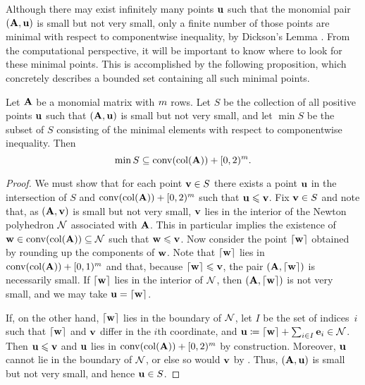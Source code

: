 \documentclass{amsart}
\begin{document}
Although there may exist infinitely many points $\mathbf{u}$ such that the monomial pair $(\mathbf{A},\mathbf{u})$ is small but not very small, only a finite number of those points are minimal with respect to componentwise inequality, by Dickson's Lemma \cite[Lemma~A]{dickson}.
From the computational perspective, it will be important to know where to look for these minimal points.
This is accomplished by the following proposition, which concretely describes a bounded set containing all such minimal points.

\begin{proposition}
   \label{prop: where to find minimal smal but not very small points}
   Let $\mathbf{A}$ be a monomial matrix with $m$ rows.
   Let $S$ be the collection of all positive points $\mathbf{u}$ such that $(\mathbf{A},\mathbf{u})$ is small but not very small, and let $\min S$ be the subset of $S$ consisting of the minimal elements with respect to componentwise inequality.
   Then
   \[\min S \subseteq \operatorname{conv}(\operatorname{col}(\mathbf{A})) + [0,2)^m.\]
\end{proposition}

\begin{proof}
   We must show that for each point $\mathbf{v} \in S$ there exists a point $\mathbf{u}$ in the intersection of $S$ and $\operatorname{conv}(\operatorname{col}(\mathbf{A})) + [0,2)^m$ such that $\mathbf{u}\leqslant \mathbf{v}$.
   Fix $\mathbf{v} \in S$ and note that, as $(\mathbf{A},\mathbf{v})$ is small but not very small, $\mathbf{v}$ lies in the interior of the Newton polyhedron $\mathcal{N}$ associated with $\mathbf{A}$.
   This in particular implies the existence of $\mathbf{w} \in \operatorname{conv}(\operatorname{col}(\mathbf{A})) \subseteq \mathcal{N}$ such that $\mathbf{w} \leqslant \mathbf{v}$.
   Now consider the point $\left\lceil \mathbf{w} \right\rceil$ obtained by rounding up the components of $\mathbf{w}$.
   Note that $\left\lceil \mathbf{w} \right\rceil$ lies in $\operatorname{conv}(\operatorname{col}(\mathbf{A})) + [0,1)^m$ and that, because $\left\lceil \mathbf{w} \right\rceil \leqslant \mathbf{v}$, the pair $(\mathbf{A},\left\lceil \mathbf{w} \right\rceil)$ is necessarily small.
   If $\left\lceil \mathbf{w} \right\rceil$ lies in the interior of $\mathcal{N}$, then $(\mathbf{A},\left\lceil \mathbf{w} \right\rceil)$ is not very small, and we may take $\mathbf{u} = \left\lceil \mathbf{w} \right\rceil$.

   If, on the other hand, $\left\lceil \mathbf{w} \right\rceil$ lies in the boundary of $\mathcal{N}$, let $I$ be the set of indices~$i$ such that $\left\lceil \mathbf{w} \right\rceil$ and $\mathbf{v}$ differ in the $i$th coordinate, and $\mathbf{u} \coloneqq \left\lceil \mathbf{w} \right\rceil + \sum_{i\in I} \mathbf{e}_i \in \mathcal{N}$.
   Then $\mathbf{u} \leqslant \mathbf{v}$ and $\mathbf{u}$ lies in $\operatorname{conv}(\operatorname{col}(\mathbf{A})) + [0,2)^m$ by construction.
   Moreover, $\mathbf{u}$ cannot lie in the boundary of $\mathcal{N}$, or else so would $\mathbf{v}$ by .
   Thus, $(\mathbf{A},\mathbf{u})$ is small but not very small, and hence  $\mathbf{u} \in S$. 
\end{proof}
\end{document}
